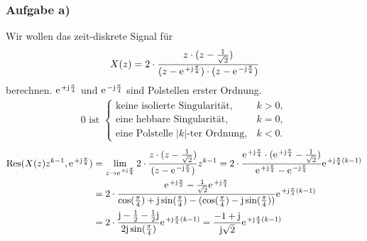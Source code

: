 \subsubsection{Aufgabe a)}
Wir wollen das zeit-diskrete Signal für
\begin{align}
	X(z)=2\cdot\frac{z\cdot(z-\frac{1}{\sqrt{2}})}{(z-\e^{+\im\frac{\pi}{4}})\cdot(z-\e^{-\im\frac{\pi}{4}})}
\end{align}
berechnen.
$\e^{+\im\frac{\pi}{4}}$ und $\e^{-\im\frac{\pi}{4}}$ sind Polstellen erster Ordnung.\\
\begin{align}
	0\text{ ist }
	\begin{cases}
		\text{keine isolierte Singularität}, &k > 0, \\
		\text{eine hebbare Singularität}, &k = 0, \\
		\text{eine Polstelle }|k|\text{-ter Ordnung}, &k <0. 
	\end{cases}
\end{align}
\begin{align}
	\mathrm{Res}(X(z)z^{k-1},\e^{+\im\frac{\pi}{4}})&=\lim\limits_{z\rightarrow\e^{+\im\frac{\pi}{4}}}2\cdot\frac{z\cdot(z-\frac{1}{\sqrt{2}})}{(z-\e^{-\im\frac{\pi}{4}})}z^{k-1}=2\cdot\frac{\e^{+\im\frac{\pi}{4}}\cdot(\e^{+\im\frac{\pi}{4}}-\frac{1}{\sqrt{2}})}{\e^{+\im\frac{\pi}{4}}-\e^{-\im\frac{\pi}{4}}}\e^{+\im\frac{\pi}{4}(k-1)} \nonumber \\
	&=2\cdot\frac{\e^{+\im\frac{\pi}{2}}-\frac{1}{\sqrt{2}}\e^{+\im\frac{\pi}{4}}}{\cos(\frac{\pi}{4})+\im\sin(\frac{\pi}{4})-(\cos(\frac{\pi}{4})-\im\sin(\frac{\pi}{4}))}\e^{+\im\frac{\pi}{4}(k-1)}\nonumber\\
	&=2\cdot\frac{\im-\frac{1}{2}-\frac{1}{2}\im}{2\im\sin(\frac{\pi}{4})}\e^{+\im\frac{\pi}{4}(k-1)}=\frac{-1+\im}{\im\sqrt{2}}\e^{+\im\frac{\pi}{4}(k-1)}
\end{align}
